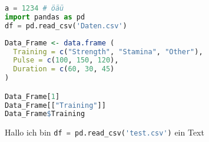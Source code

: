 \documentclass[12pt,ngerman]{scrartcl}
\begin{document}
\begin{lstlisting}[language=Python,morekeywords={read_csv}]
a = 1234 # öäü
import pandas as pd
df = pd.read_csv('Daten.csv')
\end{lstlisting}

\begin{lstlisting}[language=R]
Data_Frame <- data.frame (
  Training = c("Strength", "Stamina", "Other"),
  Pulse = c(100, 150, 120),
  Duration = c(60, 30, 45)
)

Data_Frame[1]
Data_Frame[["Training"]]
Data_Frame$Training
\end{lstlisting}



Hallo ich bin \lstinline[language=Python]{df = pd.read_csv('test.csv')} ein Text
\end{document}
